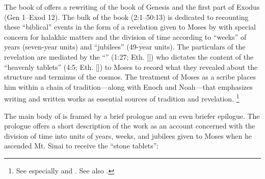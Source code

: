 The book of \jub offers a rewriting of the book of Genesis and the first part of Exodus (Gen 1--Exod 12).\autocite[1:17]{vanderkam2018} The bulk of the book (2:1--50:13) is dedicated to recounting these ``biblical'' events in the form of a revelation given to Moses by \yahweh with special concern for halakhic matters and the division of time according to ``weeks'' of years (seven-year units) and ``jubilees'' (49-year units). The particulars of the revelation are mediated by the ``\ap'' (1:27; Eth.  []) who dictates the content of the ``heavenly tablets'' (4:5; Eth.  []) to Moses to record what they revealed about the structure and terminus of the cosmos.\autocite{martinez_najman-tigchelaar2012} The treatment of Moses as a scribe places him within a chain of tradition---along with Enoch and Noah---that emphasizes writing and written works as essential sources of tradition and revelation.%
        \footnote{%
            See especially
                \cite[381--388]{najman_jsj1999} and
                \cite{najman_najman-newman2003}. See also 
                \cite{baumgarten_jsj1972}.} 

The main body of \jub is framed by a brief prologue and an even briefer epilogue. The prologue offers a short description of the work as an account concerned with the division of time into units of years, weeks, and jubilees given to Moses when he ascended Mt. Sinai to receive the ``stone tablets'':

